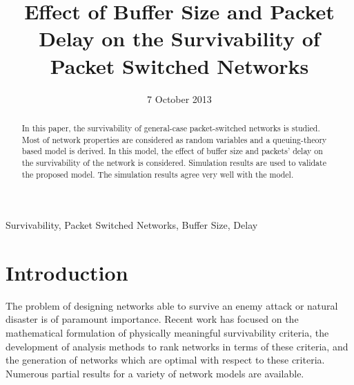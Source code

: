 \documentclass[conference]{IEEEtran}
\begin{document}
    \title{Effect of Buffer Size and Packet Delay on the Survivability of Packet Switched Networks}
    \date{7 October 2013}
    \author{
    \and
    }

    \maketitle

    \begin{abstract}
        In this paper, the survivability of general-case packet-switched networks is studied. Most of network properties are considered as random variables and a queuing-theory based model is derived. In this model, the effect of buffer size and packets' delay on the survivability of the network is considered. Simulation results are used to validate the proposed model. The simulation results agree very well with the model.
    \end{abstract}

    \begin{IEEEkeywords}
        Survivability, Packet Switched Networks, Buffer Size, Delay
    \end{IEEEkeywords}

    \section{Introduction} \label{sec:intro}
    The problem of designing networks able to survive an enemy attack or natural disaster is of paramount importance. Recent work has focused on the mathematical formulation of physically meaningful survivability criteria, the development of analysis methods to rank networks in terms of these criteria, and the generation of networks which are optimal with respect to these criteria. Numerous partial results for a variety of network models are available.
\end{document}
